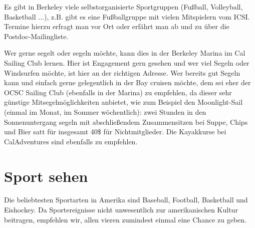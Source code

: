 \documentclass[a4paper]{scrreprt}
\begin{document}
Es gibt in Berkeley viele selbstorganisierte Sportgruppen (Fußball,
Volleyball, Basketball ...), z.B. gibt es eine Fußballgruppe mit
vielen Mitspielern vom ICSI. Termine hierzu erfragt man vor Ort oder
erfährt man ab und zu über die Postdoc-Mailingliste.

Wer gerne segelt oder segeln möchte, kann dies in der Berkeley Marina
im Cal Sailing Club lernen. Hier ist Engagement gern gesehen und wer
viel Segeln oder Windsurfen möchte, ist hier an der richtigen
Adresse. Wer bereits gut Segeln kann und einfach gerne gelegentlich in
der Bay cruisen möchte, dem sei eher der OCSC Sailing Club (ebenfalls
in der Marina) zu empfehlen, da dieser sehr günstige
Mitsegelmöglichkeiten anbietet, wie zum Beispiel den Moonlight-Sail
(einmal im Monat, im Sommer wöchentlich): zwei Stunden in den
Sonnenuntergang segeln mit abschließendem Zusammensitzen bei Suppe,
Chips und Bier satt für insgesamt 40\$ für Nichtmitglieder.
Die Kayakkurse bei CalAdventures sind ebenfalls zu empfehlen.

\section{Sport sehen}

Die beliebtesten Sportarten in Amerika sind Baseball, Football, Basketball und Eishockey. Da Sportereignisse nicht unwesentlich zur amerikanischen Kultur beitragen, empfehlen wir, allen vieren zumindest einmal eine Chance zu geben.
\end{document}
